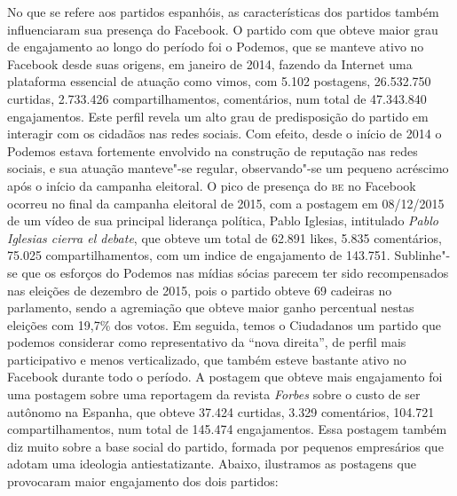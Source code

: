 No que se refere aos partidos espanhóis, as características dos partidos
também influenciaram sua presença do Facebook. O partido com que obteve
maior grau de engajamento ao longo do período foi o Podemos, que se
manteve ativo no Facebook desde suas origens, em janeiro de 2014,
fazendo da Internet uma plataforma essencial de atuação como vimos, com
5.102 postagens, 26.532.750 curtidas, 2.733.426 compartilhamentos,
comentários, num total de 47.343.840 engajamentos. Este perfil revela um
alto grau de predisposição do partido em interagir com os cidadãos nas
redes sociais. Com efeito, desde o início de 2014 o Podemos estava
fortemente envolvido na construção de reputação nas redes sociais, e sua
atuação manteve"-se regular, observando"-se um pequeno acréscimo após o
início da campanha eleitoral. O pico de presença do \textsc{be} no Facebook
ocorreu no final da campanha eleitoral de 2015, com a postagem em
08/12/2015 de um vídeo de sua principal liderança política, Pablo
Iglesias, intitulado \emph{Pablo Iglesias cierra el debate}, que obteve
um total de 62.891 likes, 5.835 comentários, 75.025 compartilhamentos,
com um indice de engajamento de 143.751. Sublinhe"-se que os esforços do
Podemos nas mídias sócias parecem ter sido recompensados nas eleições de
dezembro de 2015, pois o partido obteve 69 cadeiras no parlamento, sendo
a agremiação que obteve maior ganho percentual nestas eleições com
19,7\% dos votos. Em seguida, temos o Ciudadanos um partido que podemos
considerar como representativo da ``nova direita'', de perfil mais
participativo e menos verticalizado, que também esteve bastante ativo no
Facebook durante todo o período. A postagem que obteve mais engajamento
foi uma postagem sobre uma reportagem da revista \emph{Forbes} sobre o
custo de ser autônomo na Espanha, que obteve 37.424 curtidas, 3.329
comentários, 104.721 compartilhamentos, num total de 145.474
engajamentos. Essa postagem também diz muito sobre a base social do
partido, formada por pequenos empresários que adotam uma ideologia
antiestatizante. Abaixo, ilustramos as postagens que provocaram maior
engajamento dos dois partidos:

\pagebreak


